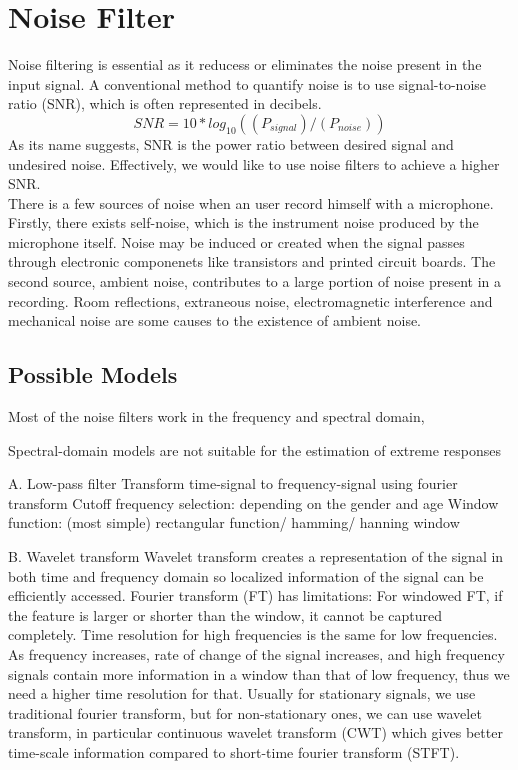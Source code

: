 \section{Noise Filter}
Noise filtering is essential as it reducess or eliminates the noise present in the input signal.
A conventional method to quantify noise is to use signal-to-noise ratio (SNR), which is often 
represented in decibels.
\[SNR=10*log_10((P_{signal})/(P_{noise}))\]
As its name suggests, SNR is the power ratio between desired signal and undesired noise. Effectively,
we would like to use noise filters to achieve a higher SNR.\\ 
There is a few sources of noise when an user record himself with a microphone.
Firstly, there exists self-noise, which is the instrument noise produced by the microphone itself.
Noise may be induced or created when the signal passes through electronic componenets like transistors 
and printed circuit boards.\cite{selfnoise} 
The second source, ambient noise, contributes to a large portion of noise present in a recording.
Room reflections, extraneous noise, electromagnetic interference and mechanical noise are some causes 
to the existence of ambient noise. 
\subsection{Possible Models}
Most of the noise filters work in the frequency and spectral domain, 

Spectral-domain models are not suitable for the estimation of extreme responses

A. Low-pass filter
Transform time-signal to frequency-signal using fourier transform
Cutoff frequency selection: depending on the gender and age
Window function: (most simple) rectangular function/ hamming/ hanning window

B. Wavelet transform
Wavelet transform creates a representation of the signal in both time and frequency domain so localized information of the signal can be efficiently accessed. Fourier transform (FT) has limitations: 
	For windowed FT, if the feature is larger or shorter than the window, it cannot be captured completely.
	Time resolution for high frequencies is the same for low frequencies. As frequency increases, rate of change of the signal increases, and high frequency signals contain more information in a window than that of low frequency, thus we need a higher time resolution for that.
Usually for stationary signals, we use traditional fourier transform, but for non-stationary ones, we can use wavelet transform, in particular continuous wavelet transform (CWT) which gives better time-scale information compared to short-time fourier transform (STFT). 
 
